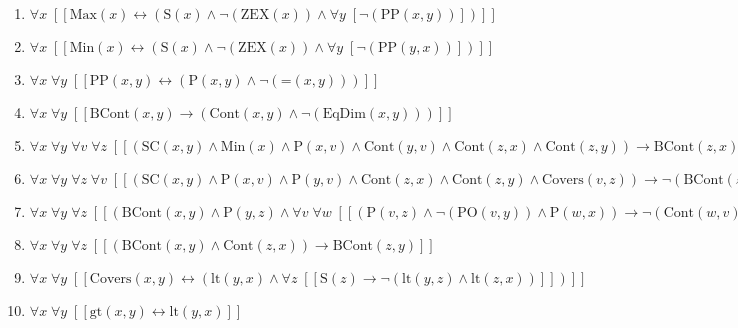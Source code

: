 \documentclass{article}
\begin{document}
\begin{enumerate}
\item $\forall x\;  \left[ \left[ \textrm{Max}(x) \leftrightarrow \left(\textrm{S}(x) \land \neg \left(\textrm{ZEX}(x)\right) \land \forall y\;  \left[ \neg \left(\textrm{PP}(x,y)\right) \right]\right) \right] \right]$
\item $\forall x\;  \left[ \left[ \textrm{Min}(x) \leftrightarrow \left(\textrm{S}(x) \land \neg \left(\textrm{ZEX}(x)\right) \land \forall y\;  \left[ \neg \left(\textrm{PP}(y,x)\right) \right]\right) \right] \right]$
\item $\forall x\; \forall y\;  \left[ \left[ \textrm{PP}(x,y) \leftrightarrow \left(\textrm{P}(x,y) \land \neg \left(\textrm{=}(x,y)\right)\right) \right] \right]$
\item $\forall x\; \forall y\;  \left[ \left[ \textrm{BCont}(x,y) \rightarrow \left(\textrm{Cont}(x,y) \land \neg \left(\textrm{EqDim}(x,y)\right)\right) \right] \right]$
\item $\forall x\; \forall y\; \forall v\; \forall z\;  \left[ \left[ \left(\textrm{SC}(x,y) \land \textrm{Min}(x) \land \textrm{P}(x,v) \land \textrm{Cont}(y,v) \land \textrm{Cont}(z,x) \land \textrm{Cont}(z,y)\right) \rightarrow \textrm{BCont}(z,x) \right] \right]$
\item $\forall x\; \forall y\; \forall z\; \forall v\;  \left[ \left[ \left(\textrm{SC}(x,y) \land \textrm{P}(x,v) \land \textrm{P}(y,v) \land \textrm{Cont}(z,x) \land \textrm{Cont}(z,y) \land \textrm{Covers}(v,z)\right) \rightarrow \neg \left(\textrm{BCont}(z,v)\right) \right] \right]$
\item $\forall x\; \forall y\; \forall z\;  \left[ \left[ \left(\textrm{BCont}(x,y) \land \textrm{P}(y,z) \land \forall v\; \forall w\;  \left[ \left[ \left(\textrm{P}(v,z) \land \neg \left(\textrm{PO}(v,y)\right) \land \textrm{P}(w,x)\right) \rightarrow \neg \left(\textrm{Cont}(w,v)\right) \right] \right]\right) \rightarrow \textrm{BCont}(x,z) \right] \right]$
\item $\forall x\; \forall y\; \forall z\;  \left[ \left[ \left(\textrm{BCont}(x,y) \land \textrm{Cont}(z,x)\right) \rightarrow \textrm{BCont}(z,y) \right] \right]$
\item $\forall x\; \forall y\;  \left[ \left[ \textrm{Covers}(x,y) \leftrightarrow \left(\textrm{lt}(y,x) \land \forall z\;  \left[ \left[ \textrm{S}(z) \rightarrow \neg \left(\textrm{lt}(y,z) \land \textrm{lt}(z,x)\right) \right] \right]\right) \right] \right]$
\item $\forall x\; \forall y\;  \left[ \left[ \textrm{gt}(x,y) \leftrightarrow \textrm{lt}(y,x) \right] \right]$

\end{enumerate}
\end{document}
